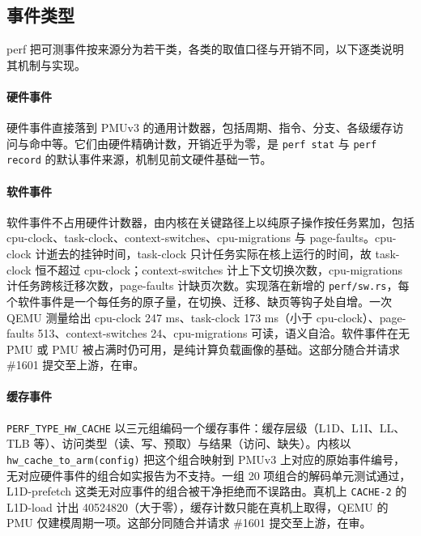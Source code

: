 \subsection{事件类型}

perf 把可测事件按来源分为若干类，各类的取值口径与开销不同，以下逐类说明其机制与实现。

\paragraph{硬件事件}
硬件事件直接落到 PMUv3 的通用计数器，包括周期、指令、分支、各级缓存访问与命中等。它们由硬件精确计数，开销近乎为零，是 \texttt{perf stat} 与 \texttt{perf record} 的默认事件来源，机制见前文硬件基础一节。

\paragraph{软件事件}
软件事件不占用硬件计数器，由内核在关键路径上以纯原子操作按任务累加，包括 cpu-clock、task-clock、context-switches、cpu-migrations 与 page-faults。cpu-clock 计逝去的挂钟时间，task-clock 只计任务实际在核上运行的时间，故 task-clock 恒不超过 cpu-clock；context-switches 计上下文切换次数，cpu-migrations 计任务跨核迁移次数，page-faults 计缺页次数。实现落在新增的 \texttt{perf/sw.rs}，每个软件事件是一个每任务的原子量，在切换、迁移、缺页等钩子处自增。一次 QEMU 测量给出 cpu-clock 247 ms、task-clock 173 ms（小于 cpu-clock）、page-faults 513、context-switches 24、cpu-migrations 可读，语义自洽。软件事件在无 PMU 或 PMU 被占满时仍可用，是纯计算负载画像的基础。这部分随合并请求 \#1601 提交至上游，在审。

\paragraph{缓存事件}
\texttt{PERF\_TYPE\_HW\_CACHE} 以三元组编码一个缓存事件：缓存层级（L1D、L1I、LL、TLB 等）、访问类型（读、写、预取）与结果（访问、缺失）。内核以 \texttt{hw\_cache\_to\_arm(config)} 把这个组合映射到 PMUv3 上对应的原始事件编号，无对应硬件事件的组合如实报告为不支持。一组 20 项组合的解码单元测试通过，L1D-prefetch 这类无对应事件的组合被干净拒绝而不误路由。真机上 \texttt{CACHE-2} 的 L1D-load 计出 40524820（大于零），缓存计数只能在真机上取得，QEMU 的 PMU 仅建模周期一项。这部分同随合并请求 \#1601 提交至上游，在审。

